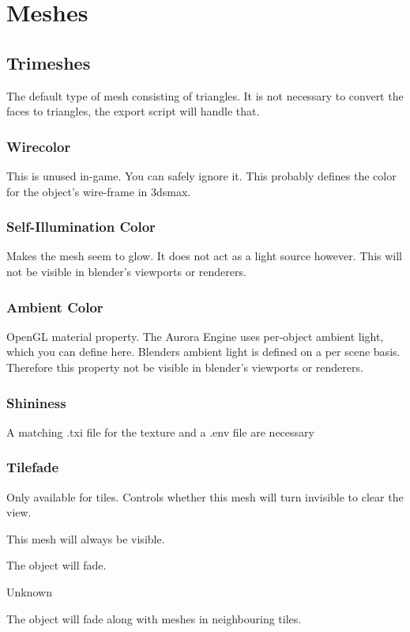 \section{Meshes}

\subsection{Trimeshes}
The default type of mesh consisting of triangles. It is not necessary to convert 
the faces to triangles, the export script will handle that.

\subsubsection*{Wirecolor}
This is unused in-game. You can safely ignore it. This probably defines the
color for the object's wire-frame in 3dsmax.

\subsubsection*{Self-Illumination Color}
Makes the mesh seem to glow. It does not act as a light source however.
This will not be visible in blender's viewports or renderers.

\subsubsection*{Ambient Color}
OpenGL material property. The Aurora Engine uses per-object ambient light,
which you can define here. Blenders ambient light is defined on a per scene
basis. Therefore this property not be visible in blender's viewports or
renderers.

\subsubsection*{Shininess}
A matching .txi file for the texture and a .env file are necessary

\subsubsection*{Tilefade}
Only available for tiles. Controls whether this mesh will turn invisible to
clear the view.
\begin{description}[leftmargin=6em,style=nextline]
    \item[None] This mesh will always be visible.
    \item[Fade] The object will fade.
    \item[Base] Unknown
    \item[Neighbour] The object will fade along with meshes in neighbouring tiles.
\end{description}

